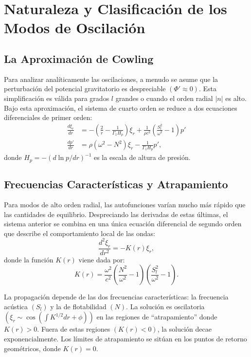 \section{Naturaleza y Clasificación de los Modos de Oscilación}

\subsection{La Aproximación de Cowling}

Para analizar analíticamente las oscilaciones, a menudo se asume que la perturbación del potencial gravitatorio es despreciable $(\Phi' \approx 0)$. Esta simplificación es válida para grados $l$ grandes o cuando el orden radial $|n|$ es alto. Bajo esta aproximación, el sistema de cuarto orden se reduce a dos ecuaciones diferenciales de primer orden:
\begin{align}
\frac{d\xi_r}{dr} &= -\left(\frac{2}{r} - \frac{1}{\Gamma_1 H_p}\right)\xi_r + \frac{1}{\rho c^2}\left(\frac{S_l^2}{\omega^2} - 1\right)p' \\
\frac{dp'}{dr} &= \rho(\omega^2 - N^2)\xi_r - \frac{1}{\Gamma_1 H_p}p',
\end{align}
donde $H_p = -(d \ln p / dr)^{-1}$ es la escala de altura de presión.

\subsection{Frecuencias Características y Atrapamiento}
Para modos de alto orden radial, las autofunciones varían mucho más rápido que las cantidades de equilibrio. Despreciando las derivadas de estas últimas, el sistema anterior se combina en una única ecuación diferencial de segundo orden que describe el comportamiento local de las ondas:
\begin{equation*}
\frac{d^2\xi_r}{dr^2} = -K(r)\xi_r,
\end{equation*}
donde la función $K(r)$ viene dada por:
\begin{equation}
K(r) = \frac{\omega^2}{c^2} \left( \frac{N^2}{\omega^2} - 1 \right) \left( \frac{S_l^2}{\omega^2} - 1 \right).
\end{equation}

La propagación depende de las dos frecuencias características: la frecuencia acústica $(S_l)$ y la de flotabilidad $(N)$. La solución es oscilatoria $(\xi_r \sim \cos(\int K^{1/2} dr + \phi))$ en las regiones de ``atrapamiento'' donde $K(r) > 0$. Fuera de estas regiones $(K(r) < 0)$, la solución decae exponencialmente. Los límites de atrapamiento se sitúan en los puntos de retorno geométricos, donde $K(r) = 0.$

